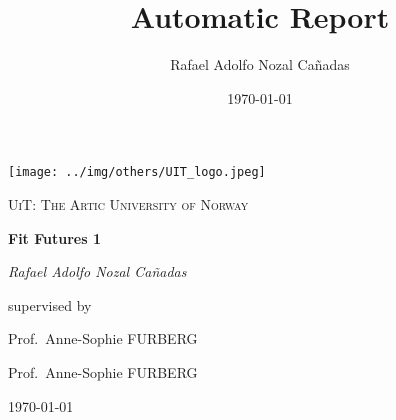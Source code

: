 \documentclass[a4paper,10pt]{report}
\title{Automatic Report}
\author{Rafael Adolfo Nozal Cañadas}
\date{\today}
\begin{document}


\begin{titlepage}
	\centering
	\texttt{[image: ../img/others/UIT\_logo.jpeg]}\par\vspace{1cm}
	{\scshape\LARGE UiT: The Artic University of Norway \par}
	\vspace{1.5cm}
	{\huge\bfseries Fit Futures 1\par}
	\vspace{2cm}
	{\Large\itshape Rafael Adolfo Nozal Cañadas\par}
	
	\vfill
	
	supervised by
	
    \begin{flushleft}

	\hspace{55mm}	 Prof.~Anne-Sophie \textsc{FURBERG}\par
	\hspace{55mm}	 Prof.~Anne-Sophie \textsc{FURBERG}\par

    \end{flushleft}

	\vfill

	{\large \today\par}
\end{titlepage}



\renewcommand{\familydefault}{\sfdefault}


  \tableofcontents




  \listoffigures
\end{document}
